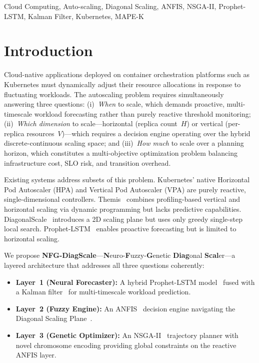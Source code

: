 \documentclass[conference]{IEEEtran}
\begin{document}
\begin{IEEEkeywords}
Cloud Computing, Auto-scaling, Diagonal Scaling, ANFIS, NSGA-II, Prophet-LSTM, Kalman Filter, Kubernetes, MAPE-K
\end{IEEEkeywords}

\section{Introduction}
\label{sec:intro}

Cloud-native applications deployed on container orchestration platforms such as Kubernetes must dynamically adjust their resource allocations in response to fluctuating workloads. The autoscaling problem requires simultaneously answering three questions: (i)~\emph{When} to scale, which demands proactive, multi-timescale workload forecasting rather than purely reactive threshold monitoring; (ii)~\emph{Which dimension} to scale---horizontal (replica count~$H$) or vertical (per-replica resources~$V$)---which requires a decision engine operating over the hybrid discrete-continuous scaling space; and (iii)~\emph{How much} to scale over a planning horizon, which constitutes a multi-objective optimization problem balancing infrastructure cost, SLO risk, and transition overhead.

Existing systems address subsets of this problem. Kubernetes' native Horizontal Pod Autoscaler (HPA) and Vertical Pod Autoscaler (VPA) are purely reactive, single-dimensional controllers. Themis~\cite{razavi2024tale} combines profiling-based vertical and horizontal scaling via dynamic programming but lacks predictive capabilities. DiagonalScale~\cite{abdullah2025diagonal} introduces a 2D scaling plane but uses only greedy single-step local search. Prophet-LSTM~\cite{guruge2025time} enables proactive forecasting but is limited to horizontal scaling.

We propose \textbf{NFG-DiagScale}---\textbf{N}euro-\textbf{F}uzzy-\textbf{G}enetic \textbf{Diag}onal \textbf{Scal}er---a layered architecture that addresses all three questions coherently:

\begin{itemize}
    \item \textbf{Layer~1 (Neural Forecaster):} A hybrid Prophet-LSTM model~\cite{guruge2025time} fused with a Kalman filter~\cite{gu2025hasgpu} for multi-timescale workload prediction.
    \item \textbf{Layer~2 (Fuzzy Engine):} An ANFIS~\cite{jang1993anfis} decision engine navigating the Diagonal Scaling Plane~\cite{abdullah2025diagonal}.
    \item \textbf{Layer~3 (Genetic Optimizer):} An NSGA-II~\cite{deb2002fast} trajectory planner with novel chromosome encoding providing global constraints on the reactive ANFIS layer.
\end{itemize}
\end{document}
